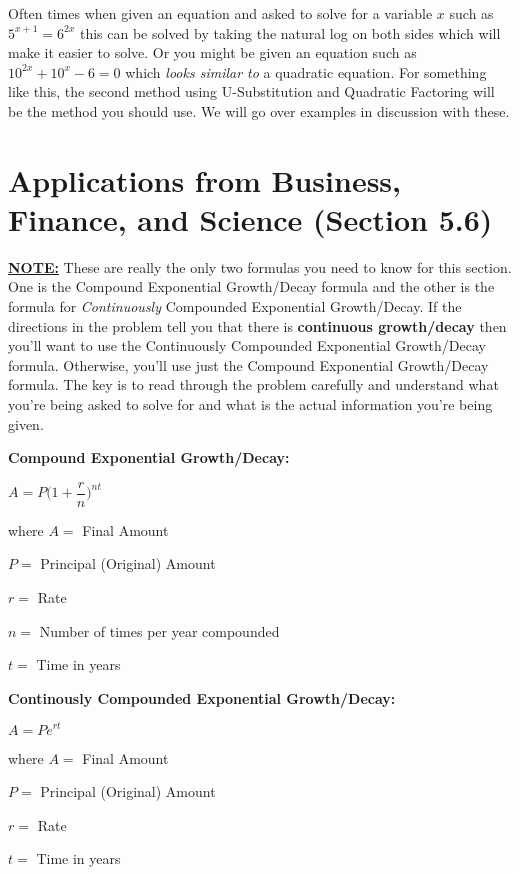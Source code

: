 \documentclass[12pt]{article}
\begin{document}
Often times when given an equation and asked to solve for a variable $x$ such as $5^{x+1} = 6^{2x}$ this can be solved by taking the natural log on both sides which will make it easier to solve. Or you might be given an equation such as $10^{2x} + 10^{x} - 6 = 0$ which \textit{looks similar to} a quadratic equation. For something like this, the second method using U-Substitution and Quadratic Factoring will be the method you should use. We will go over examples in discussion with these.

\section{Applications from Business, Finance, and Science (Section 5.6)}

\underline{\textbf{NOTE:}} These are really the only two formulas you need to know for this section. One is the Compound Exponential Growth/Decay formula and the other is the formula for \textit{Continuously}  Compounded Exponential Growth/Decay. If the directions in the problem tell you that there is \textbf{continuous growth/decay} then you'll want to use the Continuously  Compounded Exponential Growth/Decay formula. Otherwise, you'll use just the Compound Exponential Growth/Decay formula. The key is to read through the problem carefully and understand what you're being asked to solve for and what is the actual information you're being given. 

\textbf{Compound Exponential Growth/Decay:}
\newline

\centerline{$A = P\Big(1 + \dfrac{r}{n}\Big)^{nt}$}

where $A = $ Final Amount

\hspace{1cm} $P = $ Principal (Original) Amount

\hspace{1.2cm} $r = $ Rate

\hspace{1.2cm} $n = $ Number of times per year compounded

\hspace{1.2cm} $t = $ Time in years

\vspace{1cm}

\textbf{Continously Compounded Exponential Growth/Decay:}
\newline

\centerline{$A = Pe^{rt}$}

where $A = $ Final Amount

\hspace{1cm} $P = $ Principal (Original) Amount

\hspace{1.2cm} $r = $ Rate

\hspace{1.2cm} $t = $ Time in years
\end{document}
